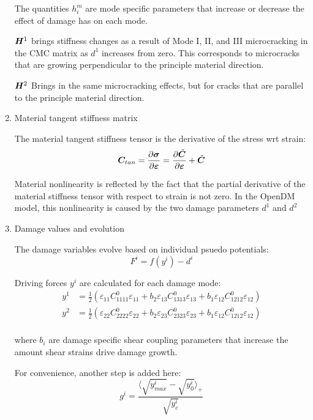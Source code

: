 \documentclass[11pt]{article}
\begin{document}
\begin{enumerate}
The quantities \(h_i^m\) are mode specific parameters that increase or
decrease the effect of damage has on each mode.

\(\bm{H}^1\) brings stiffness changes as a result of Mode I, II, and
III microcracking in the CMC matrix as \(d^1\) increases from zero. This
corresponds to microcracks that are growing perpendicular to the
principle material direction.

\(\bm{H}^2\) Brings in the same microcracking effects, but for cracks
that are parallel to the principle material direction.

\item Material tangent stiffness matrix
\label{sec:org8d4e77e}

The material tangent stiffness tensor is the derivative of the stress
wrt strain:
\[
\bm{C}_{tan} = \frac{\partial \bm{\sigma}}{\partial \bm{\varepsilon}} = 
\frac{\partial \tilde{\bm{C}}}{\partial \bm{\varepsilon}} +
\tilde{\bm{C}}
\]

Material nonlinearity is reflected by the fact that the partial
derivative of the material stiffness tensor with respect to strain is
not zero. In the OpenDM model, this nonlinearity is caused by the two
damage parameters \(d^1\) and \(d^2\)

\item Damage values and evolution
\label{sec:org79bfa6d}

The damage variables evolve based on individual psuedo potentials:
\[
F^i = f(y^i) - d^i
\]

Driving forces \(y^i\) are calculated for each damage mode:
\begin{equation}
  \begin{split}
    y^1 &= \frac{1}{2} (
    \varepsilon_{11} C^0_{1111} \varepsilon_{11} + 
    b_2 \varepsilon_{13} C^0_{1313} \varepsilon_{13} + 
    b_1 \varepsilon_{12} C^0_{1212} \varepsilon_{12} ) \\ 
    y^2 &= \frac{1}{2} (
    \varepsilon_{22} C^0_{2222} \varepsilon_{22} + 
    b_2 \varepsilon_{23} C^0_{2323} \varepsilon_{23} + 
    b_1 \varepsilon_{12} C^0_{1212} \varepsilon_{12} ) \\ 
  \end{split}
\end{equation}

where \(b_i\) are damage specific shear coupling parameters that
increase the amount shear strains drive damage growth.

For convenience, another step is added here:
\[
g^i = \frac{\langle \sqrt{y_{max}^i} - \sqrt{y_0^i}\rangle_+}{
\sqrt{y_c^i}}
\]


\end{enumerate}
\end{document}
